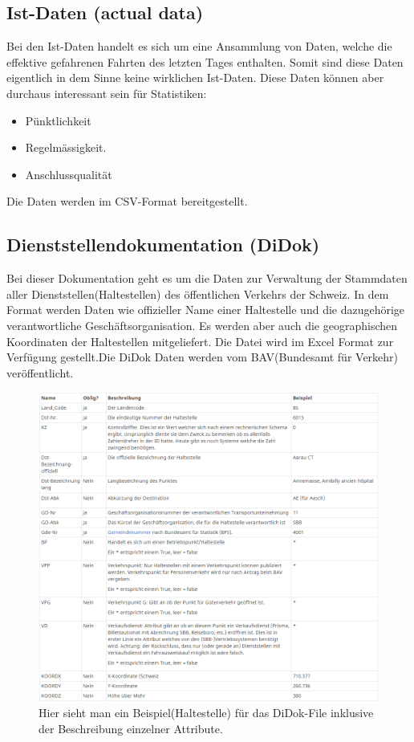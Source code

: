 \subsection{Ist-Daten (actual data)}
\label{sec:istdaten}
Bei den Ist-Daten handelt es sich um eine Ansammlung von Daten, welche die effektive gefahrenen Fahrten des letzten Tages enthalten. Somit sind diese Daten eigentlich in dem Sinne keine wirklichen Ist-Daten. Diese Daten können aber durchaus interessant sein für Statistiken:\cite{istdaten}
\begin{itemize}
	\item{Pünktlichkeit}   
	\item{Regelmässigkeit}. 
	\item{Anschlussqualität}  
\end{itemize}
Die Daten werden im CSV-Format bereitgestellt.

\subsection{Dienststellendokumentation (DiDok)}
\label{sec:didok}
Bei dieser Dokumentation geht es um die Daten zur Verwaltung der Stammdaten aller Dienststellen(Haltestellen) des öffentlichen Verkehrs der Schweiz. In dem Format werden Daten wie offizieller Name einer Haltestelle und die dazugehörige verantwortliche Geschäftsorganisation. Es werden aber auch die geographischen Koordinaten der Haltestellen mitgeliefert. Die Datei wird im Excel Format zur Verfügung gestellt.Die DiDok Daten werden vom BAV(Bundesamt für Verkehr) veröffentlicht. \cite{didok}

\begin{figure}[]
	\centering
	\includegraphics[width=15cm]{img/didokuebersicht.png}
	\caption{Hier sieht man ein Beispiel(Haltestelle) für das DiDok-File inklusive der Beschreibung einzelner Attribute.\cite{didok}}
	\label{fig:didok-uebersicht}
\end{figure}

